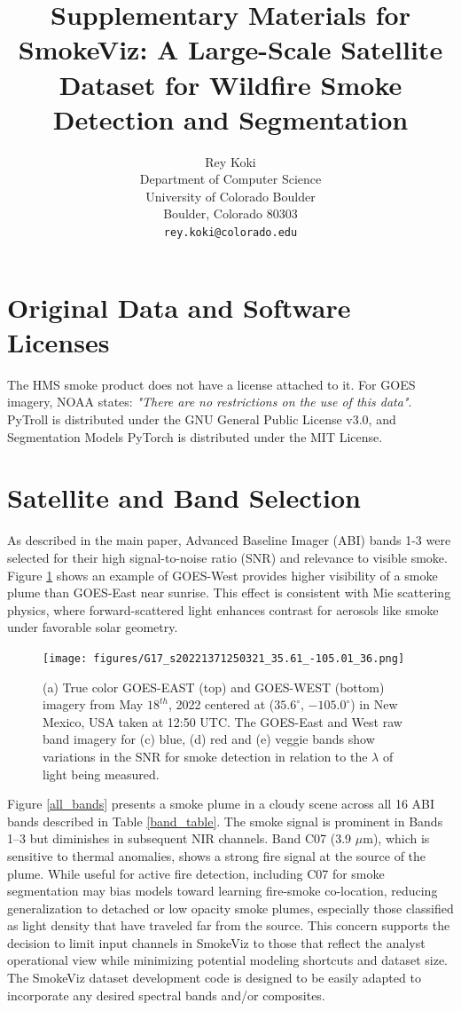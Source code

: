 \documentclass{article}
\title{Supplementary Materials for SmokeViz: A Large-Scale Satellite Dataset for Wildfire Smoke Detection and Segmentation}
\author{%
  Rey Koki\\%
  Department of Computer Science\\
  University of Colorado Boulder\\
  Boulder, Colorado 80303\\
  \texttt{rey.koki@colorado.edu} \\
}
\begin{document}
\maketitle

\appendix


\section{Original Data and Software Licenses}

The HMS smoke product does not have a license attached to it. For GOES imagery, NOAA states: \emph{"There are no restrictions on the use of this data"}. PyTroll is distributed under the GNU General Public License v3.0, and Segmentation Models PyTorch is distributed under the MIT License.

\section{Satellite and Band Selection}


As described in the main paper, Advanced Baseline Imager (ABI) bands 1-3 were selected for their high signal-to-noise ratio (SNR) and relevance to visible smoke. Figure \ref{G16_vs_G17} shows an example of GOES-West provides higher visibility of a smoke plume than GOES-East near sunrise. This effect is consistent with Mie scattering physics, where forward-scattered light enhances contrast for aerosols like smoke under favorable solar geometry.

\setcounter{figure}{9}

\begin{figure}[!htb]
    \centering
    \texttt{[image: figures/G17\_s20221371250321\_35.61\_-105.01\_36.png]}
    \caption{(a) True color GOES-EAST (top) and GOES-WEST (bottom) imagery from May \(18^{th}\), 2022 centered at (\(35.6^{\circ}\), \(-105.0^{\circ}\)) in New Mexico, USA taken at 12:50 UTC. The GOES-East and West raw band imagery for (c) blue, (d) red and (e) veggie bands show variations in the SNR for smoke detection in relation to the \(\lambda\) of light being measured.}\label{G16_vs_G17}
\end{figure}

Figure \ref{all_bands} presents a smoke plume in a cloudy scene across all 16 ABI bands described in Table \ref{band_table}. The smoke signal is prominent in Bands 1–3 but diminishes in subsequent NIR channels. Band C07 (3.9 \(\mu\)m), which is sensitive to thermal anomalies, shows a strong fire signal at the source of the plume. While useful for active fire detection, including C07 for smoke segmentation may bias models toward learning fire-smoke co-location, reducing generalization to detached or low opacity smoke plumes, especially those classified as light density that have traveled far from the source. This concern supports the decision to limit input channels in SmokeViz to those that reflect the analyst operational view while minimizing potential modeling shortcuts and dataset size. The SmokeViz dataset development code is designed to be easily adapted to incorporate any desired spectral bands and/or composites.
\end{document}
